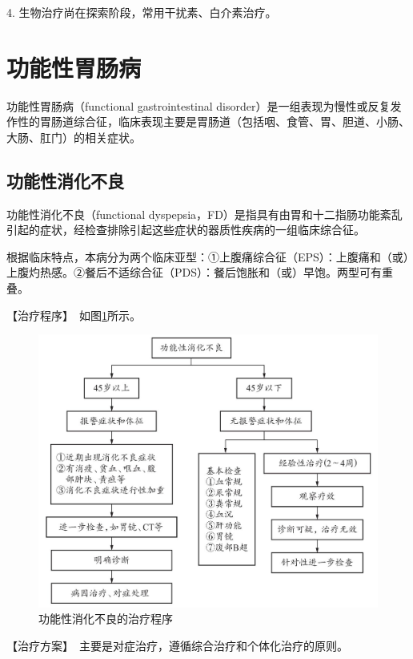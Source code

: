 4. 生物治疗尚在探索阶段，常用干扰素、白介素治疗。

\section{功能性胃肠病}

功能性胃肠病（functional gastrointestinal
disorder）是一组表现为慢性或反复发作性的胃肠道综合征，临床表现主要是胃肠道（包括咽、食管、胃、胆道、小肠、大肠、肛门）的相关症状。

\subsection{功能性消化不良}

功能性消化不良（functional
dyspepsia，FD）是指具有由胃和十二指肠功能紊乱引起的症状，经检查排除引起这些症状的器质性疾病的一组临床综合征。

根据临床特点，本病分为两个临床亚型：①上腹痛综合征（EPS）：上腹痛和（或）上腹灼热感。②餐后不适综合征（PDS）：餐后饱胀和（或）早饱。两型可有重叠。

【治疗程序】　如图\ref{fig3-8-1}所示。

\begin{figure}[!htbp]
 \centering
 \includegraphics{./images/Image00095.jpg}
 \captionsetup{justification=centering}
 \caption{功能性消化不良的治疗程序}
 \label{fig3-8-1}
  \end{figure} 

【治疗方案】　主要是对症治疗，遵循综合治疗和个体化治疗的原则。

